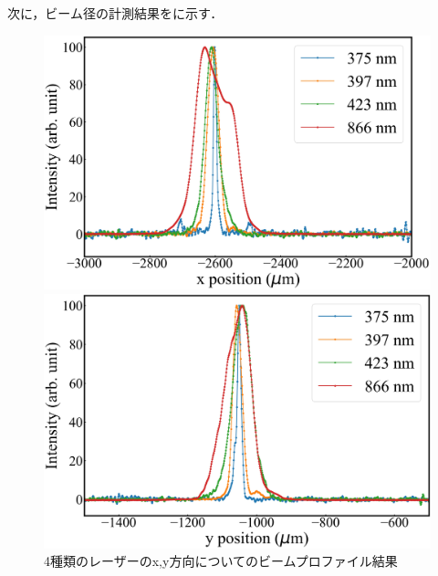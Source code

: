 次に，ビーム径の計測結果をに示す．

\begin{figure}[h]
	\begin{center}
	\begin{minipage}{0.48\linewidth}
		\includegraphics[width = 0.98\columnwidth]{./experimental_setup/figure/AllLaserXpos.jpg}
	\end{minipage}
	\begin{minipage}{0.48\linewidth}
		\begin{center}
		\includegraphics[width = 0.98\columnwidth]{./experimental_setup/figure/AllLaserYpos.jpg}
		\end{center}
	\end{minipage}
	\caption{4種類のレーザーのx,y方向についてのビームプロファイル結果}
	\label{fig:AllLaserBeamProfile}
	\end{center}
\end{figure}

